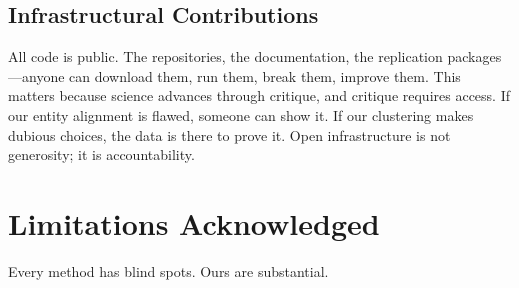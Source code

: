 \documentclass[../main.tex]{subfiles}
\begin{document}
\subsection{Infrastructural Contributions}

All code is public. The repositories, the documentation, the replication packages---anyone can download them, run them, break them, improve them. This matters because science advances through critique, and critique requires access. If our entity alignment is flawed, someone can show it. If our clustering makes dubious choices, the data is there to prove it. Open infrastructure is not generosity; it is accountability.


\section{Limitations Acknowledged}

Every method has blind spots. Ours are substantial.
\end{document}
